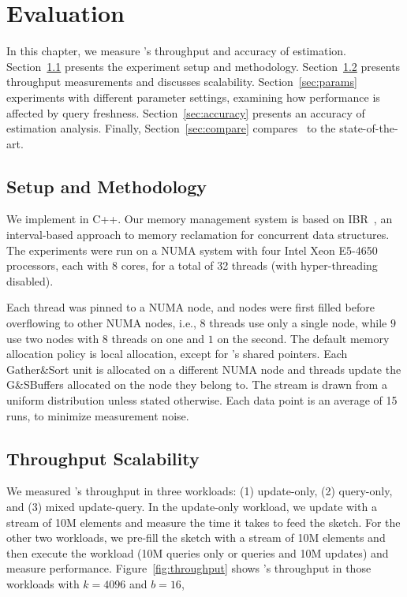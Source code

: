 \chapter{Evaluation}
\label{chap:eval}

In this chapter, we measure \mysketch's throughput and accuracy of estimation. 
Section~\ref{sec:setup} presents the experiment setup and methodology.
Section~\ref{sec:tput} presents throughput measurements and discusses scalability.
Section~\ref{sec:params} experiments with different parameter settings, examining how performance is affected by query freshness. 
Section~\ref{sec:accuracy} presents an accuracy of estimation analysis.
Finally, Section~\ref{sec:compare} compares \mysketch\ to the state-of-the-art. 

\section{Setup and Methodology}
\label{sec:setup}
We implement \mysketch in C++. Our memory management system is based on \acrshort{IBR}~\cite{Haosen_2018_IBR}, an interval-based approach to memory reclamation for concurrent data structures. 
The experiments were run on a NUMA system with four Intel Xeon E5-4650 processors, each with 8 cores, for a total of 32 threads (with hyper-threading disabled).


Each thread was pinned to a NUMA node, and nodes were first filled before overflowing to other NUMA nodes, i.e., $8$ threads use only a single node, while $9$ use two nodes with $8$ threads on one and $1$ on the second. The default memory allocation policy is local allocation, except for \mysketch's shared pointers. Each Gather\&Sort unit is allocated on a different NUMA node and threads update the G\&SBuffers allocated on the node they belong to.
The stream is drawn from a uniform distribution unless stated otherwise. Each data point is an average of 15 runs, to minimize measurement noise.

 
\section{Throughput Scalability}
\label{sec:tput} 
We measured \mysketch's throughput in three workloads:
(1) update-only, (2) query-only, and (3) mixed update-query. In the update-only workload, we update \mysketch with a stream of 10M elements and measure the time it takes to feed the sketch. For the other two workloads, we pre-fill the sketch with a stream of 10M elements and then execute the workload (10M queries only or queries and 10M updates) and measure performance. Figure~\ref{fig:throughput} shows \mysketch's throughput in those workloads with $k = 4096$ and $b = 16$,

